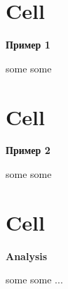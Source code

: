 \documentclass{spaceA}
\begin{document}
\section{Cell} \textbf{Пример 1}

some some

\section{Cell} \textbf{Пример 2}

some some

\section{Cell} \textbf{Analysis}

some some ...
\end{document}
